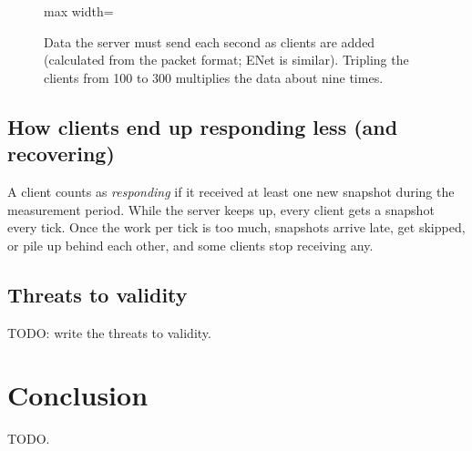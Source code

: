 \IfFileExists{IEEEtran.cls}{\ieeetrue\documentclass[conference]{IEEEtran}}{\ieeefalse\documentclass[twocolumn,10pt]{article}}
\begin{document}
\begin{figure}[H]
\centering
\begin{adjustbox}{max width=\columnwidth}\end{adjustbox}
\caption{Data the server must send each second as clients are added (calculated
from the packet format; ENet is similar). Tripling the clients from 100 to 300
multiplies the data about nine times.}
\label{fig:growth}
\end{figure}

\subsection{How clients end up responding less (and recovering)}\label{sec:chain}
A client counts as \textit{responding} if it received at least one new snapshot during the
measurement period. While the server keeps up, every client gets a snapshot every
tick. Once the work per tick is too much, snapshots arrive late, get skipped, or
pile up behind each other, and some clients stop receiving any.

\subsection{Threats to validity}
TODO: write the threats to validity.

\section{Conclusion}
TODO.
\end{document}

